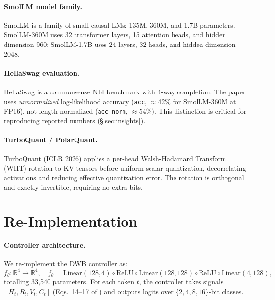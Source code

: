 \documentclass[10pt,twocolumn]{article}
\begin{document}
\paragraph{SmolLM model family.}
SmolLM \cite{allal2024smollm} is a family of small causal LMs:
135M, 360M, and 1.7B parameters.
SmolLM-360M uses 32 transformer layers, 15 attention heads, and hidden
dimension 960; SmolLM-1.7B uses 24 layers, 32 heads, and hidden
dimension 2048.

\paragraph{HellaSwag evaluation.}
HellaSwag \cite{zellers2019hellaswag} is a commonsense NLI benchmark
with 4-way completion.
The paper uses \emph{unnormalized} log-likelihood accuracy (\texttt{acc},
$\approx$42\% for SmolLM-360M at FP16), not length-normalized
(\texttt{acc\_norm}, $\approx$54\%).
This distinction is critical for reproducing reported numbers
(\S\ref{sec:insights}).

\paragraph{TurboQuant / PolarQuant.}
TurboQuant \cite{turboQuant2026} (ICLR 2026) applies a per-head
Walsh-Hadamard Transform (WHT) rotation to KV tensors before uniform
scalar quantization, decorrelating activations and reducing effective
quantization error.
The rotation is orthogonal and exactly invertible, requiring no extra
bits.

\section{Re-Implementation}
\label{sec:method}

\paragraph{Controller architecture.}
We re-implement the DWB controller as:
\[
  f_\theta: \mathbb{R}^4 \to \mathbb{R}^4, \quad
  f_\theta = \text{Linear}(128,4) \circ \text{ReLU} \circ
  \text{Linear}(128,128) \circ \text{ReLU} \circ \text{Linear}(4,128),
\]
totalling 33,540 parameters.
For each token $t$, the controller takes signals
$[H_t, R_t, V_t, C_t]$ (Eqs.\ 14--17 of \cite{haeri2026dwb}) and
outputs logits over $\{2,4,8,16\}$-bit classes.
\end{document}
